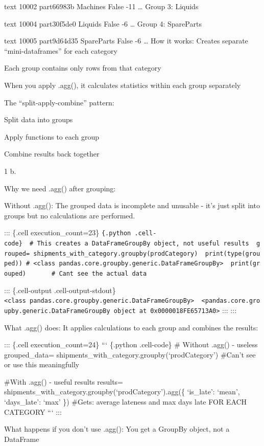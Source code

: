 \documentclass[
  letterpaper,
  DIV=11,
  numbers=noendperiod]{scrartcl}
\begin{document}
text 10002 part66983b Machines False -11 \ldots{} Group 3: Liquids

text 10004 part30f5de0 Liquids False -6 \ldots{} Group 4: SpareParts

text 10005 part9d64d35 SpareParts False -6 \ldots{} How it works:
Creates separate ``mini-dataframes'' for each category

Each group contains only rows from that category

When you apply .agg(), it calculates statistics within each group
separately

The ``split-apply-combine'' pattern:

Split data into groups

Apply functions to each group

Combine results back together

1 b.

Why we need .agg() after grouping:

Without .agg(): The grouped data is incomplete and unusable - it's just
split into groups but no calculations are performed.

::: \{.cell execution\_count=23\}
\texttt{\{.python\ .cell-code\}\ \ \#\ This\ creates\ a\ DataFrameGroupBy\ object,\ not\ useful\ results\ \ grouped=\ shipments\_with\_category.groupby(\textquotesingle{}prodCategory\textquotesingle{})\ \ print(type(grouped))\ \#\ \textless{}class\ \textquotesingle{}pandas.core.groupby.generic.DataFrameGroupBy\textquotesingle{}\textgreater{}\ \ print(grouped)\ \ \ \ \ \ \ \#\ Can\textquotesingle{}t\ see\ the\ actual\ data}

::: \{.cell-output .cell-output-stdout\}
\texttt{\textless{}class\ \textquotesingle{}pandas.core.groupby.generic.DataFrameGroupBy\textquotesingle{}\textgreater{}\ \ \textless{}pandas.core.groupby.generic.DataFrameGroupBy\ object\ at\ 0x0000018FE65713A0\textgreater{}}
::: :::

What .agg() does: It applies calculations to each group and combines the
results:

::: \{.cell execution\_count=24\} ``` \{.python .cell-code\} \# Without
.agg() - useless grouped\_data=
shipments\_with\_category.groupby(`prodCategory') \#Can't see or use
this meaningfully

\#With .agg() - useful results results=
shipments\_with\_category.groupby(`prodCategory').agg(\{ `is\_late':
`mean', `days\_late': `max' \}) \#Gets: average lateness and max days
late FOR EACH CATEGORY ``` :::

What happens if you don't use .agg(): You get a GroupBy object, not a
DataFrame
\end{document}
